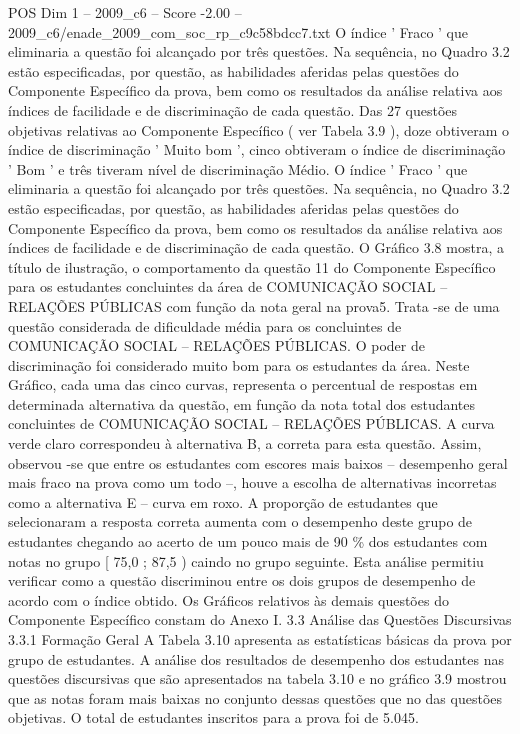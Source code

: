 \begin{textsample}{POS Dim 1 – 2009\_c6 – Score -2.00 – 2009\_c6/enade\_2009\_com\_soc\_rp\_c9c58bdcc7.txt}
O índice ' Fraco ' que eliminaria a questão foi alcançado por três questões.
Na sequência, no Quadro 3.2 estão especificadas, por questão, as habilidades aferidas pelas questões do Componente Específico da prova, bem como os resultados da análise relativa aos índices de facilidade e de discriminação de cada questão.
Das 27 questões objetivas relativas ao Componente Específico ( ver Tabela 3.9 ), doze obtiveram o índice de discriminação ' Muito bom ', cinco obtiveram o índice de discriminação ' Bom ' e três tiveram nível de discriminação Médio.
O índice ' Fraco ' que eliminaria a questão foi alcançado por três questões.
Na sequência, no Quadro 3.2 estão especificadas, por questão, as habilidades aferidas pelas questões do Componente Específico da prova, bem como os resultados da análise relativa aos índices de facilidade e de discriminação de cada questão.
O Gráfico 3.8 mostra, a título de ilustração, o comportamento da questão 11 do Componente Específico para os estudantes concluintes da área de COMUNICAÇÃO SOCIAL – RELAÇÕES PÚBLICAS com função da nota geral na prova5.
Trata -se de uma questão considerada de dificuldade média para os concluintes de COMUNICAÇÃO SOCIAL – RELAÇÕES PÚBLICAS.
O poder de discriminação foi considerado muito bom para os estudantes da área.
Neste Gráfico, cada uma das cinco curvas, representa o percentual de respostas em determinada alternativa da questão, em função da nota total dos estudantes concluintes de COMUNICAÇÃO SOCIAL – RELAÇÕES PÚBLICAS.
A curva verde claro correspondeu à alternativa B, a correta para esta questão.
Assim, observou -se que entre os estudantes com escores mais baixos – desempenho geral mais fraco na prova como um todo –, houve a escolha de alternativas incorretas como a alternativa E – curva em roxo.
A proporção de estudantes que selecionaram a resposta correta aumenta com o desempenho deste grupo de estudantes chegando ao acerto de um pouco mais de 90 \% dos estudantes com notas no grupo [ 75,0 ; 87,5 ) caindo no grupo seguinte.
Esta análise permitiu verificar como a questão discriminou entre os dois grupos de desempenho de acordo com o índice obtido.
Os Gráficos relativos às demais questões do Componente Específico constam do Anexo I. 3.3 Análise das Questões Discursivas 3.3.1 Formação Geral A Tabela 3.10 apresenta as estatísticas básicas da prova por grupo de estudantes.
A análise dos resultados de desempenho dos estudantes nas questões discursivas que são apresentados na tabela 3.10 e no gráfico 3.9 mostrou que as notas foram mais baixas no conjunto dessas questões que no das questões objetivas.
O total de estudantes inscritos para a prova foi de 5.045.

\end{textsample}
